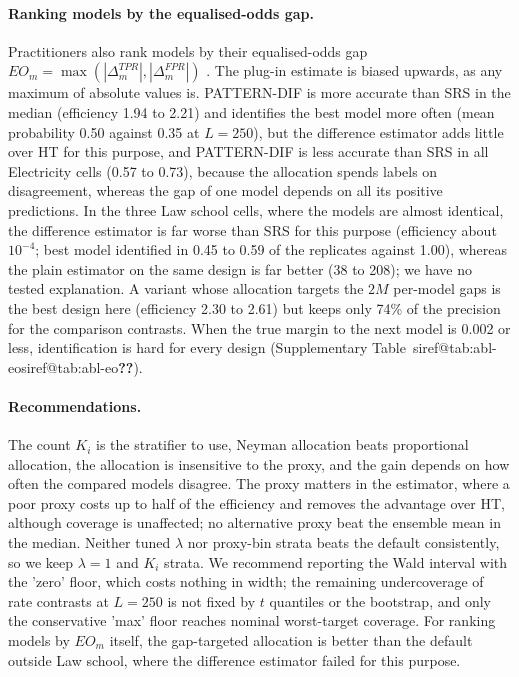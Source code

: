\documentclass[pdflatex,sn-mathphys-num,iicol]{sn-jnl}
\makeatletter
\theoremstyle{thmstyleone}
\theoremstyle{thmstyletwo}
\theoremstyle{thmstylethree}
\newcommand{\SIref}[1]{\ifcsname siref@#1\endcsname\csname siref@#1\endcsname\else\textbf{??}\fi}
\makeatother
\begin{document}
\paragraph{Ranking models by the equalised-odds gap.} Practitioners also rank models by their equalised-odds gap $EO_m=\max(|\Delta^{TPR}_m|,|\Delta^{FPR}_m|)$ \citep{hardt2016}. The plug-in estimate is biased upwards, as any maximum of absolute values is. PATTERN-DIF is more accurate than SRS in the median (efficiency 1.94 to 2.21) and identifies the best model more often (mean probability 0.50 against 0.35 at $L=250$), but the difference estimator adds little over HT for this purpose, and PATTERN-DIF is less accurate than SRS in all Electricity cells (0.57 to 0.73), because the allocation spends labels on disagreement, whereas the gap of one model depends on all its positive predictions. In the three Law school cells, where the models are almost identical, the difference estimator is far worse than SRS for this purpose (efficiency about $10^{-4}$; best model identified in 0.45 to 0.59 of the replicates against 1.00), whereas the plain estimator on the same design is far better (38 to 208); we have no tested explanation. A variant whose allocation targets the $2M$ per-model gaps is the best design here (efficiency 2.30 to 2.61) but keeps only 74\% of the precision for the comparison contrasts. When the true margin to the next model is 0.002 or less, identification is hard for every design (Supplementary Table~\SIref{tab:abl-eo}).

\paragraph{Recommendations.} The count $K_i$ is the stratifier to use, Neyman allocation beats proportional allocation, the allocation is insensitive to the proxy, and the gain depends on how often the compared models disagree. The proxy matters in the estimator, where a poor proxy costs up to half of the efficiency and removes the advantage over HT, although coverage is unaffected; no alternative proxy beat the ensemble mean in the median. Neither tuned $\lambda$ nor proxy-bin strata beats the default consistently, so we keep $\lambda=1$ and $K_i$ strata. We recommend reporting the Wald interval with the 'zero' floor, which costs nothing in width; the remaining undercoverage of rate contrasts at $L=250$ is not fixed by $t$ quantiles or the bootstrap, and only the conservative 'max' floor reaches nominal worst-target coverage. For ranking models by $EO_m$ itself, the gap-targeted allocation is better than the default outside Law school, where the difference estimator failed for this purpose.
\end{document}
